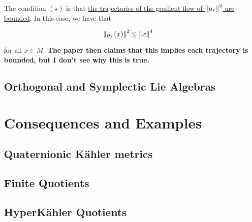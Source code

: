 \documentclass{article}
\begin{document}
The condition \((\star)\) is that \underline{the trajectories of the gradient flow of \(\norm{\mu_r}^2\) are bounded}. In this case, we have that

\[\norm{\mu_r(x)}^2 \le \norm{x}^4\]

for all \(x \in M\). \textbf{The paper then claims that this implies each trajectory is bounded, but I don't see why this is true.}

\subsection{Orthogonal and Symplectic Lie Algebras}

\section{Consequences and Examples}

\subsection{Quaternionic K\"ahler metrics}

\subsection{Finite Quotients}

\subsection{HyperK\"ahler Quotients}

\printbibliography
\end{document}
